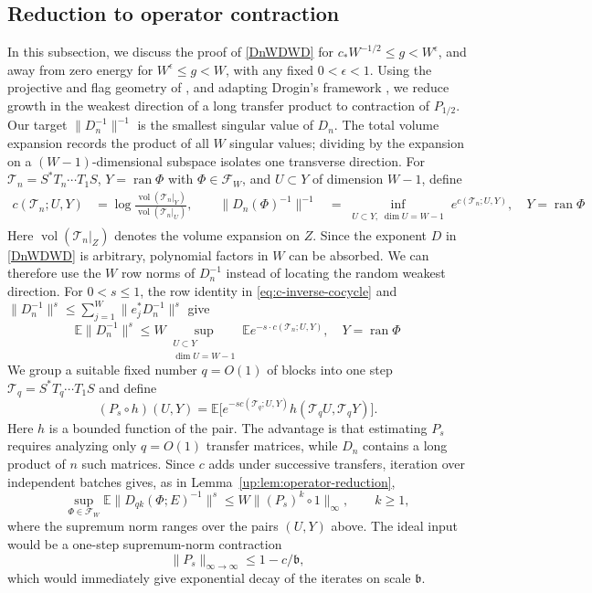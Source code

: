 \documentclass[11pt]{article}
\numberwithin{equation}{section}
\theoremstyle{remark}
\newcommand{\E}{\mathbb E}
\newcommand{\ran}{\operatorname{ran}}
\begin{document}
\subsection{Reduction to operator contraction}
\label{sec:intro-operator-contraction}
In this subsection, we discuss the proof of \eqref{DnWDWD} for
$c_*W^{-1/2}\le g<W^\epsilon$, and away from zero energy for
$W^\epsilon\le g<W$, with any fixed $0<\epsilon<1$.
Using the projective and flag geometry of \cite{Furstenberg,Lessa},
and adapting Drogin's framework \cite[Sections~2 and~4]{Drogin}, we reduce
growth in the weakest direction of a long transfer product to
contraction of $P_{1/2}$.
Our target $\|D_n^{-1}\|^{-1}$ is the smallest singular value of $D_n$.
The total volume expansion records the product of all $W$ singular
values; dividing by the expansion on a $(W-1)$-dimensional subspace
isolates one transverse direction. For
$\mathcal T_n=S^*T_n\cdots T_1S$, $Y=\ran\Phi$ with $\Phi\in\mathcal F_W$, and
$U\subset Y$ of dimension $W-1$, define
\[
 \begin{aligned}
 c(\mathcal T_n;U,Y)&=\log\frac{\operatorname{vol}(\mathcal T_n|_Y)}
                          {\operatorname{vol}(\mathcal T_n|_U)},\qquad
 \|D_n(\Phi)^{-1}\|^{-1}
 &=\inf_{\substack{U\subset Y,\; \dim U=W-1}}e^{c(\mathcal T_n;U,Y)},\quad Y=\ran\Phi
 \end{aligned}
\]
Here $\operatorname{vol}(\mathcal T_n|_Z)$ denotes the volume expansion on $Z$.
Since the exponent $D$ in \eqref{DnWDWD} is arbitrary, polynomial
factors in $W$ can be absorbed. We can therefore use the $W$ row norms
of $D_n^{-1}$ instead of locating the random weakest direction.
For $0<s\le1$, the row identity in \eqref{eq:c-inverse-cocycle} and
$\|D_n^{-1}\|^s\le\sum_{j=1}^W\|e_j^*D_n^{-1}\|^s$ give
\[
 \E\|D_n^{-1}\|^s
 \le W\sup_{\substack{U\subset Y\\\dim U=W-1}}
       \E e^{-s\cdot  c(\mathcal T_n;U,Y)}, \quad Y =\ran\Phi
\]
We group a suitable fixed number $q=O(1)$ of blocks into one step
$\mathcal T_q=S^*T_q\cdots T_1S$ and define
\[
 (P_s\circ h)(U,Y)
 =\E\bigl[e^{-s c(\mathcal T_q;U,Y)}h(\mathcal T_qU,\mathcal T_qY)\bigr].
\]
Here $h$ is a bounded function of the pair. The advantage is that
estimating $P_s$ requires analyzing only $q=O(1)$ transfer matrices,
while $D_n$ contains a long product of $n$ such matrices.
Since $c$ adds under
successive transfers, iteration over independent batches gives,
as in Lemma~\ref{up:lem:operator-reduction},
\[
 \sup_{\Phi\in\mathcal F_W}\E\|D_{qk}(\Phi;E)^{-1}\|^s
 \le W\|(P_s)^k\circ 1\|_\infty,\qquad k\ge1,
\]
where the supremum norm ranges over the pairs $(U,Y)$ above.
The ideal input would be a one-step supremum-norm contraction
\[
 \|P_s\|_{\infty\to\infty}\le1-c/\mathfrak b,
\]
which would immediately give exponential decay of the iterates on
scale $\mathfrak b$.
\end{document}
